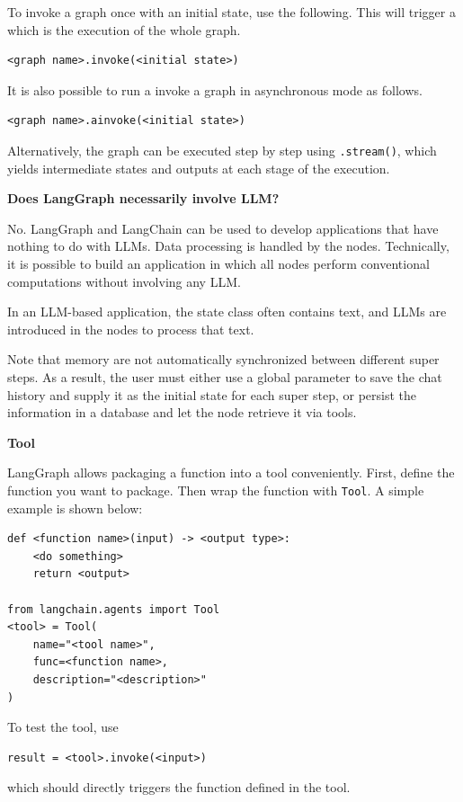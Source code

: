 To invoke a graph once with an initial state, use the following. This will trigger a  which is the execution of the whole graph.
\begin{lstlisting}
<graph name>.invoke(<initial state>)
\end{lstlisting}
It is also possible to run a invoke a graph in asynchronous mode as follows.
\begin{lstlisting}
<graph name>.ainvoke(<initial state>)
\end{lstlisting}
Alternatively, the graph can be executed step by step using \verb|.stream()|, which yields intermediate states and outputs at each stage of the execution.

\begin{mdframed}
\textbf{Does LangGraph necessarily involve LLM?}

No. LangGraph and LangChain can be used to develop applications that have nothing to do with LLMs. Data processing is handled by the nodes. Technically, it is possible to build an application in which all nodes perform conventional computations without involving any LLM.

In an LLM-based application, the state class often contains text, and LLMs are introduced in the nodes to process that text.
\end{mdframed}

Note that memory are not automatically synchronized between different super steps. As a result, the user must either use a global parameter to save the chat history and supply it as the initial state for each super step, or persist the information in a database and let the node retrieve it via tools.

\vspace{0.1in}
\noindent \textbf{Tool}
\vspace{0.1in}

LangGraph allows packaging a function into a tool conveniently. First, define the function you want to package. Then wrap the function with \verb|Tool|. A simple example is shown below:
\begin{lstlisting}
def <function name>(input) -> <output type>:
    <do something>
    return <output>

from langchain.agents import Tool
<tool> = Tool(
    name="<tool name>",
    func=<function name>,
    description="<description>"
)
\end{lstlisting}

To test the tool, use
\begin{lstlisting}
result = <tool>.invoke(<input>)
\end{lstlisting}
which should directly triggers the function defined in the tool.


